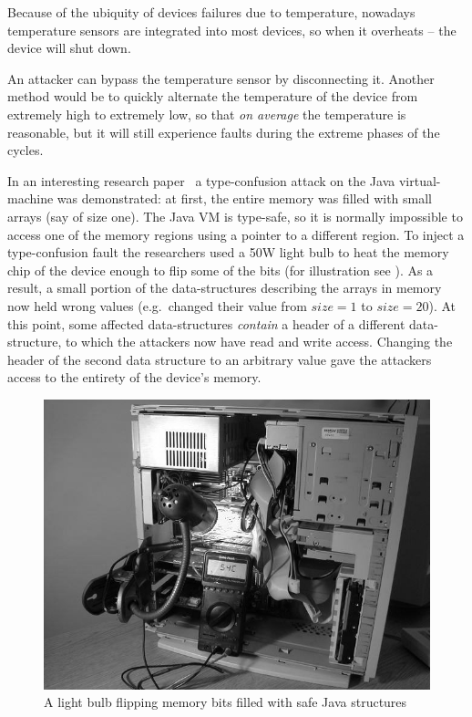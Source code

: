 Because of the ubiquity of devices failures due to temperature, nowadays
temperature sensors are integrated into most devices, so when it overheats --
the device will shut down.

An attacker can bypass the temperature sensor by disconnecting it. Another
method would be to quickly alternate the temperature of the device from
extremely high to extremely low, so that \emph{on average} the temperature is
reasonable, but it will still experience faults during the extreme phases of the
cycles.

In an interesting research paper~\cite{appel} a type-confusion attack on the
Java virtual-machine was demonstrated: at first, the entire memory was filled
with small arrays (say of size one). The Java VM is type-safe, so it is normally
impossible to access one of the memory regions using a pointer to a different
region. To inject a type-confusion fault the researchers used a 50W light bulb
to heat the memory chip of the device enough to flip some of the bits (for
illustration see ). As a result, a small portion of
the data-structures describing the arrays in memory now held wrong values (e.g.\
changed their value from \(size=1\) to \(size=20\)). At this point, some
affected data-structures \emph{contain} a header of a different data-structure,
to which the attackers now have read and write access. Changing the header of
the second data structure to an arbitrary value gave the attackers access to the
entirety of the device's memory.

\begin{figure}[!ht]
	\centering
	\includegraphics[width=0.7\linewidth]{images/chapter_9/bulb.png}
	\caption{A light bulb flipping memory bits filled with safe Java structures}\label{fig:memory_lightbulb}
\end{figure}

